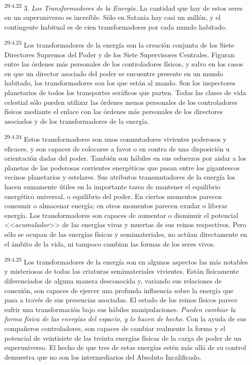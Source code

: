 \par
\textsuperscript{29:4.22} 3. \textit{Los Transformadores de la Energía.} La cantidad que hay de estos seres en un superuniverso es increíble. Sólo en Satania hay casi un millón, y el contingente habitual es de cien transformadores por cada mundo habitado.

\par
\textsuperscript{29:4.23} Los transformadores de la energía son la creación conjunta de los Siete Directores Supremos del Poder y de los Siete Supervisores Centrales. Figuran entre las órdenes más personales de los controladores físicos, y salvo en los casos en que un director asociado del poder se encuentre presente en un mundo habitado, los transformadores son los que están al mando. Son los inspectores planetarios de todos los transportes seráficos que parten. Todas las clases de vida celestial sólo pueden utilizar las órdenes menos personales de los controladores físicos mediante el enlace con las órdenes más personales de los directores asociados y de los transformadores de la energía.

\par
\textsuperscript{29:4.24} Estos transformadores son unos conmutadores vivientes poderosos y eficaces, y son capaces de colocarse a favor o en contra de una disposición u orientación dadas del poder. También son hábiles en sus esfuerzos por aislar a los planetas de las poderosas corrientes energéticas que pasan entre los gigantescos vecinos planetarios y estelares. Sus atributos transmutadores de la energía los hacen sumamente útiles en la importante tarea de mantener el equilibrio energético universal, o equilibrio del poder. En ciertos momentos parecen consumir o almacenar energía; en otros momentos parecen exudar o liberar energía. Los transformadores son capaces de aumentar o disminuir el potencial <<\textit{acumulador}>> de las energías vivas y muertas de sus reinos respectivos. Pero sólo se ocupan de las energías físicas y semimateriales, no actúan directamente en el ámbito de la vida, ni tampoco cambian las formas de los seres vivos.

\par
\textsuperscript{29:4.25} Los transformadores de la energía son en algunos aspectos las más notables y misteriosas de todas las criaturas semimateriales vivientes. Están físicamente diferenciados de alguna manera desconocida y, variando sus relaciones de conexión, son capaces de ejercer una profunda influencia sobre la energía que pasa a través de sus presencias asociadas. El estado de los reinos físicos parece sufrir una transformación bajo sus hábiles manipulaciones. \textit{Pueden cambiar la forma física de las energías del espacio, y lo hacen de hecho.} Con la ayuda de sus compañeros controladores, son capaces de cambiar realmente la forma y el potencial de veintisiete de las treinta energías físicas de la carga de poder de un superuniverso. El hecho de que tres de estas energías estén más allá de su control demuestra que no son los intermediarios del Absoluto Incalificado.

